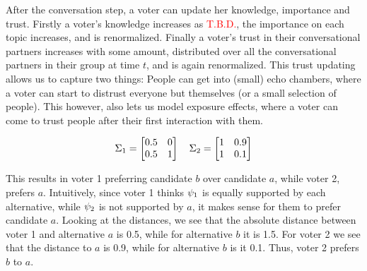 \begin{example}
	After the conversation step, a voter can update her knowledge,
	importance and trust. Firstly a voter's knowledge increases as
	\textcolor{red}{T.B.D.}, the importance on each topic increases, and is
	renormalized. Finally a voter's trust in their conversational partners
	increases with some amount, distributed over all the conversational
	partners in their group at time $t$, and is again renormalized. This
	trust updating allows us to capture two things: People can get into
	(small) echo chambers, where a voter can start to distrust everyone but
	themselves (or a small selection of people). This however, also lets us
	model exposure effects, where a voter can come to trust people after
	their first interaction with them.

	\[
		\Sigma_1 =\begin{bmatrix}
			0.5 & 0 \\
			0.5 & 1 \\
		\end{bmatrix}\quad
		\Sigma_2 =\begin{bmatrix}
			1 & 0.9 \\
			1 & 0.1 \\
		\end{bmatrix}
	\]

	This results in voter 1 preferring candidate $b$ over candidate $a$, while voter 2, prefers $a$. Intuitively, since voter 1 thinks $\psi_{1}$ is equally supported by each alternative, while $\psi_{2}$ is not supported by $a$, it makes sense for them to prefer candidate $a$. Looking at the distances, we see that the absolute distance between voter 1 and alternative $a$ is 0.5, while for alternative $b$ it is 1.5. For voter 2 we see that the distance to $a$ is 0.9, while for alternative $b$ is it 0.1. Thus, voter 2 prefers $b$ to $a$.



\end{example}
